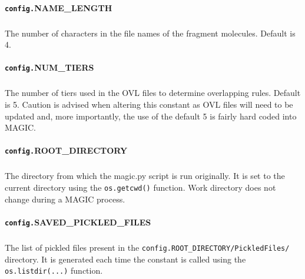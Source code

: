 \documentclass[a4paper,11pt,oneside,openright]{book}
\begin{document}
{\paragraph[\texttt{NAME\_LENGTH}]{\texttt{config.}\textbf{NAME\_LENGTH}}
\subparagraph{}The number of characters in the file names of the fragment molecules. Default is 4.
\paragraph[\texttt{NUM\_TIERS}]{\texttt{config.}\textbf{NUM\_TIERS}} 
\subparagraph{}The number of tiers used in the OVL files to determine overlapping rules. Default is 5. Caution is advised when altering this constant as OVL files will need to be updated and, more importantly, the use of the default 5 is fairly hard coded into MAGIC.
\paragraph[\texttt{ROOT\_DIRECTORY}]{\texttt{config.}\textbf{ROOT\_DIRECTORY}} 
\subparagraph{}The directory from which the magic.py script is run originally. It is set to the current directory using the \texttt{os.getcwd()} function. Work directory does not change during a MAGIC process. 
\paragraph[\texttt{SAVED\_PICKLED\_FILES}]{\texttt{config.}\textbf{SAVED\_PICKLED\_FILES}} 
\subparagraph{}The list of pickled files present in the \texttt{config.ROOT\_DIRECTORY/PickledFiles/} directory. It is generated each time the constant is called using the \texttt{os.listdir(...)} function.
}
\end{document}
